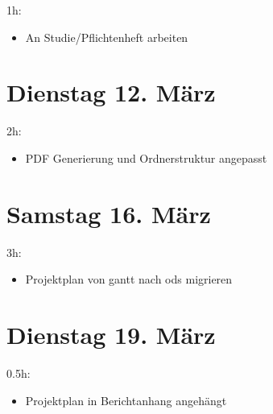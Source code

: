 1h:

\begin{itemize}
\tightlist
\item
  An Studie/Pflichtenheft arbeiten
\end{itemize}

\section{Dienstag 12. März}\label{dienstag-12.muxe4rz}

2h:

\begin{itemize}
\tightlist
\item
  PDF Generierung und Ordnerstruktur angepasst
\end{itemize}

\section{Samstag 16. März}\label{samstag-16.muxe4rz}

3h:

\begin{itemize}
\tightlist
\item
  Projektplan von gantt nach ods migrieren
\end{itemize}

\section{Dienstag 19. März}\label{dienstag-19.muxe4rz}

0.5h:

\begin{itemize}
\tightlist
\item
  Projektplan in Berichtanhang angehängt
\end{itemize}

